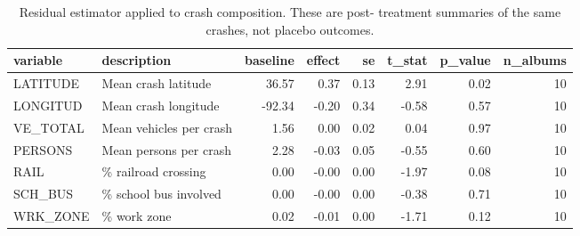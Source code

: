 \begin{table}
\caption{Residual estimator applied to crash composition. These are post- treatment summaries of the same crashes, not placebo outcomes.}
\begin{tabular}{llrrrrrr}
\toprule
variable & description & baseline & effect & se & t\_stat & p\_value & n\_albums \\
\midrule
LATITUDE & Mean crash latitude & 36.57 & 0.37 & 0.13 & 2.91 & 0.02 & 10 \\
LONGITUD & Mean crash longitude & -92.34 & -0.20 & 0.34 & -0.58 & 0.57 & 10 \\
VE\_TOTAL & Mean vehicles per crash & 1.56 & 0.00 & 0.02 & 0.04 & 0.97 & 10 \\
PERSONS & Mean persons per crash & 2.28 & -0.03 & 0.05 & -0.55 & 0.60 & 10 \\
RAIL & \% railroad crossing & 0.00 & -0.00 & 0.00 & -1.97 & 0.08 & 10 \\
SCH\_BUS & \% school bus involved & 0.00 & -0.00 & 0.00 & -0.38 & 0.71 & 10 \\
WRK\_ZONE & \% work zone & 0.02 & -0.01 & 0.00 & -1.71 & 0.12 & 10 \\
\bottomrule
\end{tabular}
\end{table}
